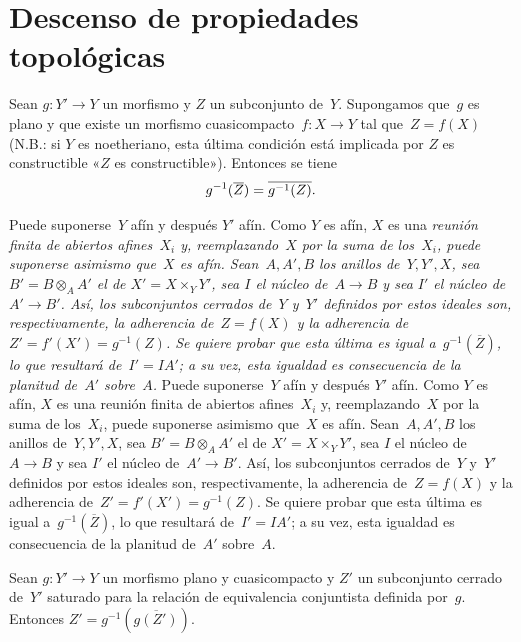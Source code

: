 \section{Descenso de propiedades topológicas}
\label{VIII.4}

\begin{theoreme}
\label{VIII.4.1}
Sean $g\colon Y'\to Y$ un morfismo y $Z$ un subconjunto de~$Y$.
Supongamos que~$g$ es plano y que existe un morfismo
cuasicompacto~$f\colon X\to Y$ tal que~$Z=f(X)$ (N.B.: si $Y$ es
noetheriano, esta última condición está implicada por
{$Z$ es constructible}
{«$Z$ es constructible»}). Entonces se tiene
$$
g^{-1}(\overline{Z})=\overline{g^{-1}(Z)}.
$$
\end{theoreme}

{Puede suponerse~$Y$ afín y después $Y'$ afín. Como $Y$ es afín,
$X$ es una \emph{reunión
finita de abiertos afines~$X_{i}$ y, reemplazando~$X$ por la suma de
los~$X_{i}$, puede suponerse asimismo que~$X$ es afín. Sean~$A,A',B$ los
anillos de~$Y,Y',X$, sea $B'=B\otimes_{A}A'$ el de
$X'=X\times_{Y}Y'$, sea $I$ el núcleo de~$A\to B$ y sea $I'$ el núcleo
de~$A'\to B'$. Así, los subconjuntos cerrados de~$Y$ y~$Y'$ definidos
por estos ideales son, respectivamente, la adherencia de~$Z=f(X)$ y la
adherencia de~$Z'=f'(X')=g^{-1}(Z)$. Se quiere probar que esta última es
igual a~$g^{-1}(\overline{Z})$, lo que resultará de~$I'=IA'$; a su vez,
esta igualdad es consecuencia de la planitud de~$A'$ sobre~$A$.}}
{Puede suponerse~$Y$ afín y después $Y'$ afín. Como $Y$ es afín,
$X$ es una reunión
finita de abiertos afines~$X_{i}$ y, reemplazando~$X$ por la suma de
los~$X_{i}$, puede suponerse asimismo que~$X$ es afín. Sean~$A,A',B$ los
anillos de~$Y,Y',X$, sea $B'=B\otimes_{A}A'$ el de
$X'=X\times_{Y}Y'$, sea $I$ el núcleo de~$A\to B$ y sea $I'$ el núcleo
de~$A'\to B'$. Así, los subconjuntos cerrados de~$Y$ y~$Y'$ definidos
por estos ideales son, respectivamente, la adherencia de~$Z=f(X)$ y la
adherencia de~$Z'=f'(X')=g^{-1}(Z)$. Se quiere probar que esta última es
igual a~$g^{-1}(\overline{Z})$, lo que resultará de~$I'=IA'$; a su vez,
esta igualdad es consecuencia de la planitud de~$A'$ sobre~$A$.}

\begin{corollaire}
\label{VIII.4.2}
Sean $g\colon Y'\to Y$ un morfismo plano y cuasicompacto y $Z'$ un
subconjunto cerrado de~$Y'$ saturado para la relación de equivalencia
conjuntista definida por~$g$. Entonces
$Z'=g^{-1}(\overline{g(Z')})$.
\end{corollaire}

